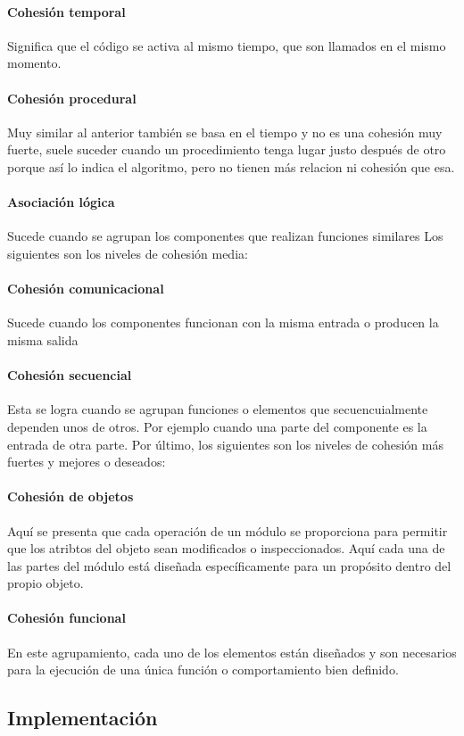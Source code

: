 \paragraph{Cohesión temporal} Significa que el código se activa al mismo tiempo, que son llamados en el mismo momento. 
\paragraph{Cohesión procedural} Muy similar al anterior también se basa en el tiempo y no es una cohesión muy fuerte, suele suceder cuando un procedimiento tenga lugar justo después de otro porque así lo indica el algoritmo, pero no tienen más relacion ni cohesión que esa.
\paragraph{Asociación lógica} Sucede cuando se agrupan los componentes que realizan funciones similares
Los siguientes son los niveles de cohesión media:
\paragraph{Cohesión comunicacional} Sucede cuando los componentes funcionan con la misma entrada o producen la misma salida 
\paragraph{Cohesión secuencial} Esta se logra cuando se agrupan funciones o elementos que secuencuialmente dependen unos de otros. Por ejemplo cuando una parte del componente es la entrada de otra parte. 
Por último, los siguientes son los niveles de cohesión más fuertes y mejores o deseados:
\paragraph{Cohesión de objetos} Aquí se presenta que cada operación de un módulo se proporciona para permitir que los atribtos del objeto sean modificados o inspeccionados. Aquí cada una de las partes del módulo está diseñada específicamente para un propósito dentro del propio objeto.
\paragraph{Cohesión funcional} En este agrupamiento, cada uno de los elementos están diseñados y son necesarios para la ejecución de una única función o comportamiento bien definido. 

\subsection{Implementación}

